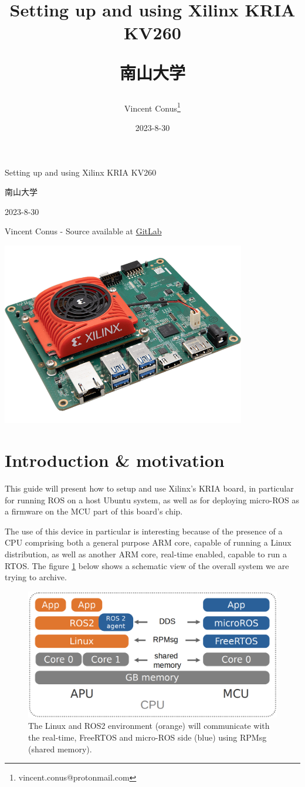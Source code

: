 \documentclass[10pt]{article}
\author{Vincent Conus\thanks{vincent.conus@protonmail.com}}
\date{2023-8-30}
\title{Setting up and using Xilinx KRIA KV260\\\medskip
\large \begin{CJK}{UTF8}{min}南山大学\end{CJK}}
\newcommand{\gitlab}[1]{%
\href{#1}{GitLab \faGitlab}}
\begin{document}
\begin{titlepage}
\centering
{\LARGE Setting up and using Xilinx KRIA KV260 \par }
\vspace{5mm}
{\large \begin{CJK}{UTF8}{min}南山大学\end{CJK} \par}
\vspace{1cm}
{\large 2023-8-30 \par}
\vspace{2cm}
{\large Vincent Conus -  Source available at \gitlab{https://gitlab.com/sunoc/xilinx-kria-kv260-documentation} \par}
\vspace{3cm}
\includegraphics[width=0.8\textwidth]{./img/board}\end{titlepage}
\tableofcontents
\pagebreak
\section{Introduction \& motivation}
\label{sec:org422a77f}
This guide will present how to setup and use Xilinx's KRIA board, in particular
for running ROS on a host Ubuntu system, as well as for deploying
micro-ROS as a firmware on the MCU part of this board's chip.

The use of this device in particular is interesting because of the presence
of a CPU comprising both a general purpose ARM core, capable of running
a Linux distribution, as well as another ARM core, real-time enabled,
capable to run a RTOS. The figure \ref{fig:orgbeff03b} below shows a schematic
view of the overall system we are trying to archive.

\begin{figure}[htbp]
\centering
\includegraphics[width=.6\textwidth]{./img/map.png}
\caption{\label{fig:orgbeff03b}The Linux and ROS2 environment (orange) will communicate with the real-time, FreeRTOS and micro-ROS side (blue) using RPMsg (shared memory).}
\end{figure}
\end{document}
